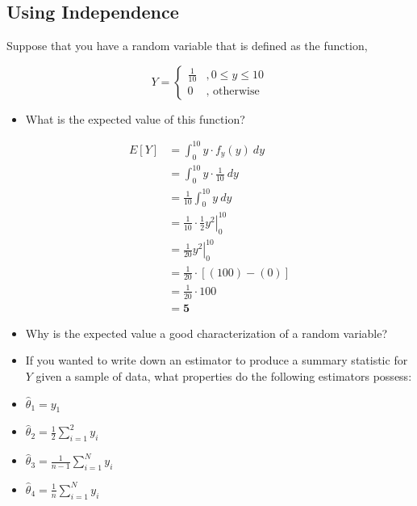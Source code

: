\documentclass[
]{article}
\providecommand{\tightlist}{%
  \setlength{\itemsep}{0pt}\setlength{\parskip}{0pt}}
\theoremstyle{definition}
\theoremstyle{definition}
\theoremstyle{definition}
\theoremstyle{definition}
\theoremstyle{remark}
\begin{document}
\subsection{Using Independence}\label{using-independence}

Suppose that you have a random variable that is defined as the function,

\[
Y = 
  \begin{cases}
    \frac{1}{10} & ,0 \leq y \leq 10 \\ 
    0 & \text{, otherwise}
  \end{cases}
\]

\begin{itemize}
\tightlist
\item
  What is the expected value of this function?
\end{itemize}

\[
\begin{aligned}
  E[Y]  &= \int_{0}^{10} y \cdot f_{y}(y) \ dy                       \\ 
        &= \int_{0}^{10} y \cdot \frac{1}{10} \ dy                   \\ 
        &= \frac{1}{10}\int_{0}^{10} y \ dy                          \\ 
        &= \left.\frac{1}{10} \cdot \frac{1}{2}  y^2\right|_{0}^{10} \\ 
        &= \left.\frac{1}{20}  y^{2} \right|_{0}^{10}                \\ 
        &= \frac{1}{20} \cdot \left[(100) - (0) \right]              \\ 
        &= \frac{1}{20} \cdot 100                                    \\
        &= \mathbf{5}
\end{aligned}
\]

\begin{itemize}
\item
  Why is the expected value a good characterization of a random variable?
\item
  If you wanted to write down an estimator to produce a summary statistic for \(Y\) given a sample of data, what properties do the following estimators possess:
\item
  \(\hat{\theta}_{1} = y_{1}\)
\item
  \(\hat{\theta}_{2} = \frac{1}{2} \displaystyle\sum_{i=1}^{2} y_{i}\)
\item
  \(\hat{\theta}_{3} = \frac{1}{n-1} \displaystyle\sum_{i=1}^{N} y_{i}\)
\item
  \(\hat{\theta}_{4} = \frac{1}{n} \displaystyle\sum_{i=1}^{N} y_{i}\)
\end{itemize}
\end{document}
